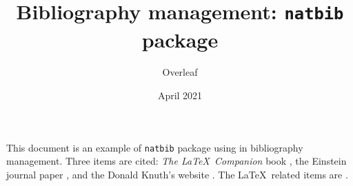 \documentclass{article}
\title{Bibliography management: \texttt{natbib} package}
\author{Overleaf}
\date {April 2021}
\begin{document}
    \maketitle

    This document is an example of \texttt{natbib} package using in bibliography
    management. Three items are cited: \textit{The \LaTeX\ Companion} book \citet{2021Boosting}, the Einstein journal paper \citet{einstein}, and the
    Donald Knuth's website \cite{knuthwebsite}. The \LaTeX\ related items are
    \cite{latexcompanion,knuthwebsite}.

    \citet{2021Boosting}

    
\end{document}
